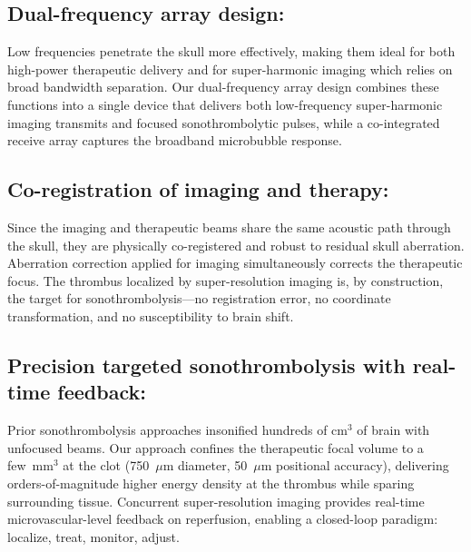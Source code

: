 \subsection{Dual-frequency array design:} Low frequencies penetrate the skull more effectively, making them ideal for both high-power therapeutic delivery and for super-harmonic imaging which relies on broad bandwidth separation. Our dual-frequency array design combines these functions into a single device that delivers both low-frequency super-harmonic imaging transmits and focused sonothrombolytic pulses, while a co-integrated receive array captures the broadband microbubble response.

\subsection{Co-registration of imaging and therapy:} Since the imaging and therapeutic beams share the same acoustic path through the skull, they are physically co-registered and robust to residual skull aberration. Aberration correction applied for imaging simultaneously corrects the therapeutic focus. The thrombus localized by super-resolution imaging is, by construction, the target for sonothrombolysis---no registration error, no coordinate transformation, and no susceptibility to brain shift.

\subsection{Precision targeted sonothrombolysis with real-time feedback:} Prior sonothrombolysis approaches insonified hundreds of cm$^3$ of brain with unfocused beams. Our approach confines the therapeutic focal volume to a few~mm$^3$ at the clot (750~$\mu$m diameter, 50~$\mu$m positional accuracy), delivering orders-of-magnitude higher energy density at the thrombus while sparing surrounding tissue. Concurrent super-resolution imaging provides real-time microvascular-level feedback on reperfusion, enabling a closed-loop paradigm: localize, treat, monitor, adjust.

